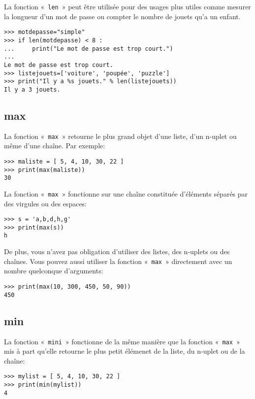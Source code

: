 La fonction « \texttt{len} » peut être utilisée pour des usages plus utiles comme mesurer la longueur d'un mot de passe ou compter le nombre de jouets qu'a un enfant.

\begin{Verbatim}[frame=single,rulecolor=\color{gray}]
>>> motdepasse="simple"
>>> if len(motdepasse) < 8 :
...     print("Le mot de passe est trop court.")
...
Le mot de passe est trop court.
>>> listejouets=['voiture', 'poupée', 'puzzle']
>>> print("Il y a %s jouets." % len(listejouets))
Il y a 3 jouets.
\end{Verbatim} 

\subsection*{max}

La fonction « \texttt{max} » retourne le plus grand objet d'une liste,  d'un n-uplet ou même d'une chaîne. Par exemple:

\begin{Verbatim}[frame=single,rulecolor=\color{gray}]
>>> maliste = [ 5, 4, 10, 30, 22 ]
>>> print(max(maliste))
30
\end{Verbatim}

La fonction « \texttt{max} » fonctionne sur une chaîne constituée d'éléments séparés par des virgules ou des espaces:
\begin{Verbatim}[frame=single,rulecolor=\color{gray}]
>>> s = 'a,b,d,h,g'
>>> print(max(s))
h
\end{Verbatim}

De plus, vous n'avez pas obligation d'utiliser des listes, des n-uplets ou des chaînes. Vous pouvez aussi utiliser la fonction « \texttt{max} » directement avec un nombre quelconque d'arguments:
\begin{Verbatim}[frame=single,rulecolor=\color{gray}]
>>> print(max(10, 300, 450, 50, 90))
450
\end{Verbatim}

\subsection*{min}
La fonction « \texttt{mini} » fonctionne de la même manière que la fonction « \texttt{max} » mis à part qu'elle retourne le plus petit élémenet de la liste, du n-uplet ou de la chaîne:
\begin{Verbatim}[frame=single,rulecolor=\color{gray}]
>>> mylist = [ 5, 4, 10, 30, 22 ]
>>> print(min(mylist))
4
\end{Verbatim}

